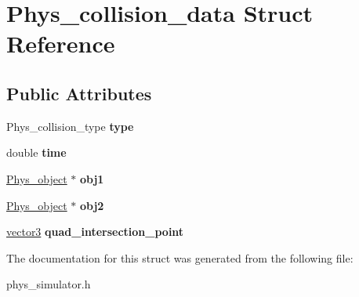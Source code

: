 \hypertarget{struct_phys__collision__data}{
\section{Phys\_\-collision\_\-data Struct Reference}
\label{struct_phys__collision__data}
}
\subsection*{Public Attributes}
\begin{DoxyCompactItemize}
\item 
\hypertarget{struct_phys__collision__data_a95cf4539cff2b9b8afb34b0b2331e920}{
Phys\_\-collision\_\-type {\bfseries type}}
\label{struct_phys__collision__data_a95cf4539cff2b9b8afb34b0b2331e920}

\item 
\hypertarget{struct_phys__collision__data_a26e06a95fc4c6f43a081fe37141e6f5d}{
double {\bfseries time}}
\label{struct_phys__collision__data_a26e06a95fc4c6f43a081fe37141e6f5d}

\item 
\hypertarget{struct_phys__collision__data_a483a2e9f976e3642dd70d13d8d2ec68f}{
\hyperlink{class_phys__object}{Phys\_\-object} $\ast$ {\bfseries obj1}}
\label{struct_phys__collision__data_a483a2e9f976e3642dd70d13d8d2ec68f}

\item 
\hypertarget{struct_phys__collision__data_aa363c610b0e636787356054071240a07}{
\hyperlink{class_phys__object}{Phys\_\-object} $\ast$ {\bfseries obj2}}
\label{struct_phys__collision__data_aa363c610b0e636787356054071240a07}

\item 
\hypertarget{struct_phys__collision__data_acc49851721c6a3a5613c36b533a93905}{
\hyperlink{classvector3d}{vector3} {\bfseries quad\_\-intersection\_\-point}}
\label{struct_phys__collision__data_acc49851721c6a3a5613c36b533a93905}

\end{DoxyCompactItemize}


The documentation for this struct was generated from the following file:\begin{DoxyCompactItemize}
\item 
phys\_\-simulator.h\end{DoxyCompactItemize}
